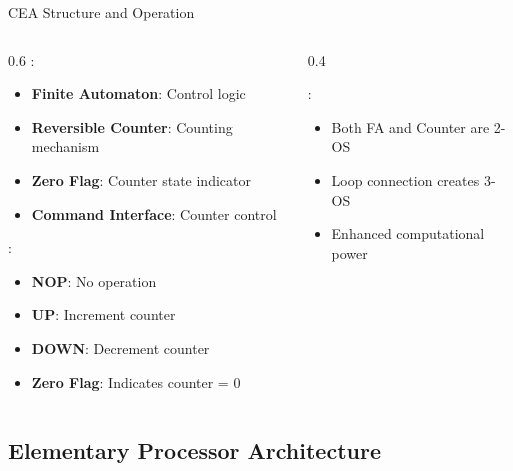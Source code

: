 \begin{frame}{CEA Structure and Operation}
\begin{columns}
\begin{column}{0.6\textwidth}
:
\begin{itemize}
\item \textbf{Finite Automaton}: Control logic
\item \textbf{Reversible Counter}: Counting mechanism
\item \textbf{Zero Flag}: Counter state indicator
\item \textbf{Command Interface}: Counter control
\end{itemize}

\vspace{0.3cm}
:
\begin{itemize}
\item \textbf{NOP}: No operation
\item \textbf{UP}: Increment counter
\item \textbf{DOWN}: Decrement counter
\item \textbf{Zero Flag}: Indicates counter = 0
\end{itemize}
\end{column}
\begin{column}{0.4\textwidth}
\begin{center}

\end{center}
:
\begin{itemize}
\item Both FA and Counter are 2-OS
\item Loop connection creates 3-OS
\item Enhanced computational power
\end{itemize}
\end{column}
\end{columns}
\end{frame}

\subsection{Elementary Processor Architecture}

